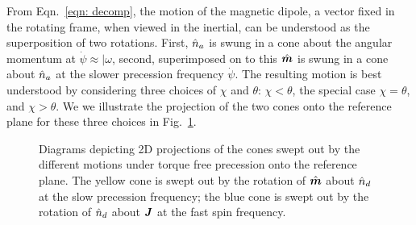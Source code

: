 \documentclass[../full_thesis/full_thesis.tex]{subfiles}
\begin{document}
From Eqn.~\eqref{eqn: decomp}, the motion of the magnetic dipole, a vector
fixed in the rotating frame, when viewed in the inertial, can be understood as
the superposition of two rotations. First, $\hat{n}_a$ is swung in a cone about the
angular momentum at $\dot{\psi} \approx |\omega$, second, superimposed on to
this $\hat{\boldsymbol{m}}$ is swung in a cone about $\hat{n}_a$ at the slower precession frequency
$\dot{\psi}$. The resulting motion is best understood by considering three
choices of $\chi$ and $\theta$: $\chi < \theta$, the special case $\chi =
\theta$, and $\chi > \theta$. We we illustrate the projection of the two
cones onto the reference plane for these three choices in Fig.~\ref{fig: cones}.
\begin{figure}[ht]
\centering
\caption{Diagrams depicting 2D projections of the cones swept out by the
    different motions under torque free precession onto the reference plane.
    The yellow cone is swept out by the rotation of $\hat{\boldsymbol{m}}$ about $\hat{n}_{d}$ at the
    slow precession frequency; the blue cone is swept out by the rotation of
    $\hat{n}_{d}$ about $\boldsymbol{J}$ at the fast spin frequency.}
\label{fig: cones}
\end{figure}
\end{document}
